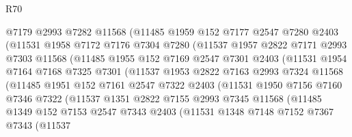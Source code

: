 \begin{lexlean}{R70}
\begin{coremodule}
                @7179
                @2993
                @7282
                @11568
                (@11485
                  @1959
                  @152
                  @7177
                  @2547
                  @7280
                  @2403
                  (@11531
                    @1958
                    @7172
                    @7176
                    @7304
                    @7280
                    (@11537
                      @1957
                      @2822
                      @7171
                      @2993
                      @7303
                      @11568
                      (@11485
                        @1955
                        @152
                        @7169
                        @2547
                        @7301
                        @2403
                        (@11531
                          @1954
                          @7164
                          @7168
                          @7325
                          @7301
                          (@11537
                            @1953
                            @2822
                            @7163
                            @2993
                            @7324
                            @11568
                            (@11485
                              @1951
                              @152
                              @7161
                              @2547
                              @7322
                              @2403
                              (@11531
                                @1950
                                @7156
                                @7160
                                @7346
                                @7322
                                (@11537
                                  @1351
                                  @2822
                                  @7155
                                  @2993
                                  @7345
                                  @11568
                                  (@11485
                                    @1349
                                    @152
                                    @7153
                                    @2547
                                    @7343
                                    @2403
                                    (@11531
                                      @1348
                                      @7148
                                      @7152
                                      @7367
                                      @7343
                                      (@11537

\end{coremodule}
\end{lexlean}
